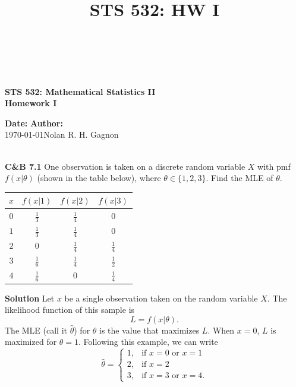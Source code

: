 \documentclass{article}
\title{STS 532: HW I}
\newcommand{\mybox}{%
    \collectbox{%
        \setlength{\fboxsep}{1pt}%
        \fbox{\BOXCONTENT}%
    }%
}
\begin{document}
\begin{center}
\hrulefill \\
\vspace{-0.7cm}
\hrulefill \\
\vspace{-0.3cm}

\begin{Large}
\textbf{STS 532:  Mathematical Statistics II} \\
\textbf{Homework I} \\
\end{Large}
\begin{large}
\end{large}
\vspace{-7mm}
\noindent \textbf{Date:} \hfill \textbf{Author:}\\
\noindent\today \hfill Nolan R. H. Gagnon \\

\vspace{-0.4cm}
\hrulefill \\
\vspace{-0.7cm}
\hrulefill
\end{center}

\vspace{7mm}

\noindent\mybox{\textbf{C\&B 7.1}} One observation is taken on a discrete random variable $X$ with pmf $f(x|\theta)$ (shown in the table below), where $\theta \in \lbrace 1, 2, 3 \rbrace$.  Find the MLE of $\theta$.  

\begin{center}
\begin{tabular}{cccc}
\hline
$x$ & $f(x|1)$ & $f(x|2)$ & $f(x|3)$ \\
\hline
$0$ & $\frac{1}{3}$ & $\frac{1}{4}$ & $0$ \\
$1$ & $\frac{1}{3}$ & $\frac{1}{4}$ & $0$ \\
$2$ & $0$ & $\frac{1}{4}$ & $\frac{1}{4}$ \\
$3$ & $\frac{1}{6}$ & $\frac{1}{4}$ & $\frac{1}{2}$ \\
$4$ & $\frac{1}{6}$ & $0$ & $\frac{1}{4}$ \\
\hline
\end{tabular}
\end{center}

\vspace{5mm}

\noindent\mybox{\textbf{Solution}} Let $x$ be a single observation taken on the random variable $X$.  The likelihood function of this sample is $$L= f(x|\theta).$$  The MLE (call it $\hat{\theta}$) for $\theta$ is the value that maximizes $L$.  When $x=0$, $L$ is maximized for $\theta = 1$.  Following this example, we can write 
$$\hat{\theta} = 
\begin{cases}
1, & \text{if } x=0 \text{ or } x=1 \\
2, & \text{if } x=2 \\
3, & \text{if } x = 3 \text{ or } x = 4.
\end{cases}
$$
\end{document}
